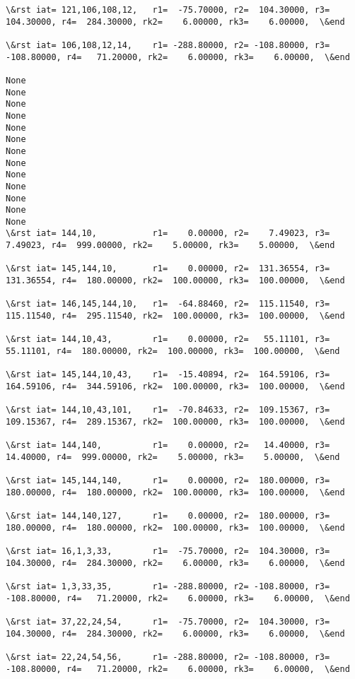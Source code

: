 \documentclass[11pt]{article}
\begin{document}
\begin{Verbatim}[commandchars=\\\{\}]
\&rst iat= 121,106,108,12,   r1=  -75.70000, r2=  104.30000, r3=  104.30000, r4=  284.30000, rk2=    6.00000, rk3=    6.00000,  \&end

\&rst iat= 106,108,12,14,    r1= -288.80000, r2= -108.80000, r3= -108.80000, r4=   71.20000, rk2=    6.00000, rk3=    6.00000,  \&end

None
None
None
None
None
None
None
None
None
None
None
None
None
\&rst iat= 144,10,           r1=    0.00000, r2=    7.49023, r3=    7.49023, r4=  999.00000, rk2=    5.00000, rk3=    5.00000,  \&end

\&rst iat= 145,144,10,       r1=    0.00000, r2=  131.36554, r3=  131.36554, r4=  180.00000, rk2=  100.00000, rk3=  100.00000,  \&end

\&rst iat= 146,145,144,10,   r1=  -64.88460, r2=  115.11540, r3=  115.11540, r4=  295.11540, rk2=  100.00000, rk3=  100.00000,  \&end

\&rst iat= 144,10,43,        r1=    0.00000, r2=   55.11101, r3=   55.11101, r4=  180.00000, rk2=  100.00000, rk3=  100.00000,  \&end

\&rst iat= 145,144,10,43,    r1=  -15.40894, r2=  164.59106, r3=  164.59106, r4=  344.59106, rk2=  100.00000, rk3=  100.00000,  \&end

\&rst iat= 144,10,43,101,    r1=  -70.84633, r2=  109.15367, r3=  109.15367, r4=  289.15367, rk2=  100.00000, rk3=  100.00000,  \&end

\&rst iat= 144,140,          r1=    0.00000, r2=   14.40000, r3=   14.40000, r4=  999.00000, rk2=    5.00000, rk3=    5.00000,  \&end

\&rst iat= 145,144,140,      r1=    0.00000, r2=  180.00000, r3=  180.00000, r4=  180.00000, rk2=  100.00000, rk3=  100.00000,  \&end

\&rst iat= 144,140,127,      r1=    0.00000, r2=  180.00000, r3=  180.00000, r4=  180.00000, rk2=  100.00000, rk3=  100.00000,  \&end

\&rst iat= 16,1,3,33,        r1=  -75.70000, r2=  104.30000, r3=  104.30000, r4=  284.30000, rk2=    6.00000, rk3=    6.00000,  \&end

\&rst iat= 1,3,33,35,        r1= -288.80000, r2= -108.80000, r3= -108.80000, r4=   71.20000, rk2=    6.00000, rk3=    6.00000,  \&end

\&rst iat= 37,22,24,54,      r1=  -75.70000, r2=  104.30000, r3=  104.30000, r4=  284.30000, rk2=    6.00000, rk3=    6.00000,  \&end

\&rst iat= 22,24,54,56,      r1= -288.80000, r2= -108.80000, r3= -108.80000, r4=   71.20000, rk2=    6.00000, rk3=    6.00000,  \&end


\end{Verbatim}
\end{document}
